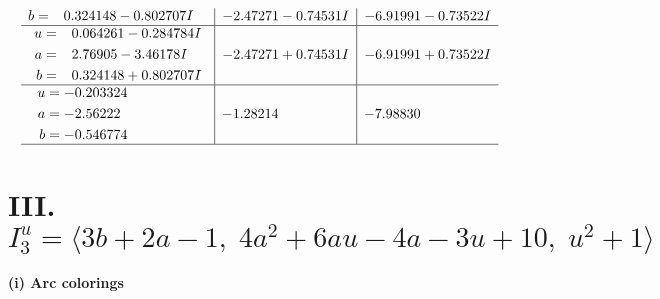\documentclass[1p]{elsarticle_modified}
\theoremstyle{definition}
\begin{document}
$$\begin{array}{c|c|c}
\begin{aligned}
b &= \phantom{-}0.324148 - 0.802707 I\end{aligned}
 & -2.47271 - 0.74531 I & -6.91991 - 0.73522 I \\ \hline\begin{aligned}
u &= \phantom{-}0.064261 - 0.284784 I \\
a &= \phantom{-}2.76905 - 3.46178 I \\
b &= \phantom{-}0.324148 + 0.802707 I\end{aligned}
 & -2.47271 + 0.74531 I & -6.91991 + 0.73522 I \\ \hline\begin{aligned}
u &= -0.203324\phantom{ +0.000000I} \\
a &= -2.56222\phantom{ +0.000000I} \\
b &= -0.546774\phantom{ +0.000000I}\end{aligned}
 & -1.28214\phantom{ +0.000000I} & -7.98830\phantom{ +0.000000I}\\
 \hline 
 \end{array}$$\newpage\newpage\renewcommand{\arraystretch}{1}
\centering \section*{III. $I^u_{3}= \langle 3 b+2 a-1,\;4 a^2+6 a u-4 a-3 u+10,\;u^2+1 \rangle$}
\flushleft \textbf{(i) Arc colorings}\\
\end{document}
